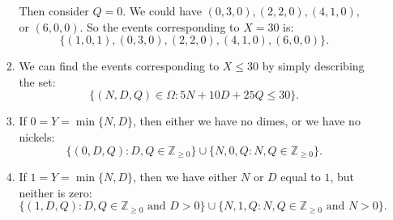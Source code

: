 \documentclass{article}
\begin{document}
\begin{enumerate}
\begin{enumerate}
\begin{enumerate}
                Then consider $Q=0$. We could have $(0,3,0),(2,2,0),(4,1,0),$ or $(6,0,0)$.
                So the events corresponding to  $X= 30$ is:
                \[
                \{(1,0,1),(0,3,0),(2,2,0),(4,1,0),(6,0,0)\} 
                .\] 
            \item We can find the events corresponding to $X\leq 30$ by simply describing the set:
                 \[
                \{(N,D,Q)\in \Omega: 5N+10D+25Q\leq30\} 
                .\] %
            \item If $0=Y=\min \{N,D\} $, then either we have no dimes, or we have no nickels:
                \[
                    \{(0,D,Q):D,Q\in \mathbb{Z}_{\ge 0}\} \cup \{N,0,Q:N,Q\in \mathbb{Z}_{\ge 0}\} 
                .\] 
            \item If $1=Y=\min \{N,D\} $, then we have either $N$ or $D$ equal to $1$, but neither is zero: %
                \[
                    \{(1,D,Q):D,Q\in \mathbb{Z}_{\ge 0}\text{ and }D>0\} \cup \{N,1,Q:N,Q\in \mathbb{Z}_{\ge 0}\text{ and }N>0\} 
                .\] 
        \end{enumerate}
    \end{enumerate}
\end{enumerate}
\end{document}
